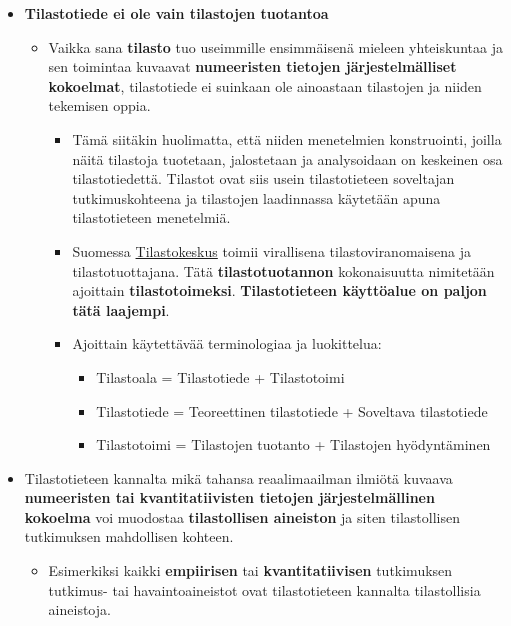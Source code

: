 \documentclass[
]{book}
\providecommand{\tightlist}{%
  \setlength{\itemsep}{0pt}\setlength{\parskip}{0pt}}
\begin{document}
\begin{itemize}
\tightlist
\item
  \textbf{Tilastotiede ei ole vain tilastojen tuotantoa}

  \begin{itemize}
  \tightlist
  \item
    Vaikka sana \textbf{tilasto} tuo useimmille ensimmäisenä mieleen yhteiskuntaa ja sen toimintaa kuvaavat \textbf{numeeristen tietojen järjestelmälliset kokoelmat}, tilastotiede ei suinkaan ole ainoastaan tilastojen ja niiden tekemisen oppia.

    \begin{itemize}
    \tightlist
    \item
      Tämä siitäkin huolimatta, että niiden menetelmien konstruointi, joilla näitä tilastoja tuotetaan, jalostetaan ja analysoidaan on keskeinen osa tilastotiedettä. Tilastot ovat siis usein tilastotieteen soveltajan tutkimuskohteena ja tilastojen laadinnassa käytetään apuna tilastotieteen menetelmiä.
    \item
      Suomessa \href{https://www.stat.fi/}{Tilastokeskus} toimii virallisena tilastoviranomaisena ja tilastotuottajana. Tätä \textbf{tilastotuotannon} kokonaisuutta nimitetään ajoittain \textbf{tilastotoimeksi}. \textbf{Tilastotieteen käyttöalue on paljon tätä laajempi}.
    \item
      Ajoittain käytettävää terminologiaa ja luokittelua:

      \begin{itemize}
      \tightlist
      \item
        Tilastoala = Tilastotiede + Tilastotoimi\\
      \item
        Tilastotiede = Teoreettinen tilastotiede + Soveltava tilastotiede\\
      \item
        Tilastotoimi = Tilastojen tuotanto + Tilastojen hyödyntäminen
      \end{itemize}
    \end{itemize}
  \end{itemize}
\item
  Tilastotieteen kannalta mikä tahansa reaalimaailman ilmiötä kuvaava \textbf{numeeristen tai kvantitatiivisten tietojen järjestelmällinen kokoelma} voi muodostaa \textbf{tilastollisen aineiston} ja siten tilastollisen tutkimuksen mahdollisen kohteen.

  \begin{itemize}
  \tightlist
  \item
    Esimerkiksi kaikki \textbf{empiirisen} tai \textbf{kvantitatiivisen} tutkimuksen tutkimus- tai havaintoaineistot ovat tilastotieteen kannalta tilastollisia aineistoja.
  \end{itemize}
\end{itemize}
\end{document}
